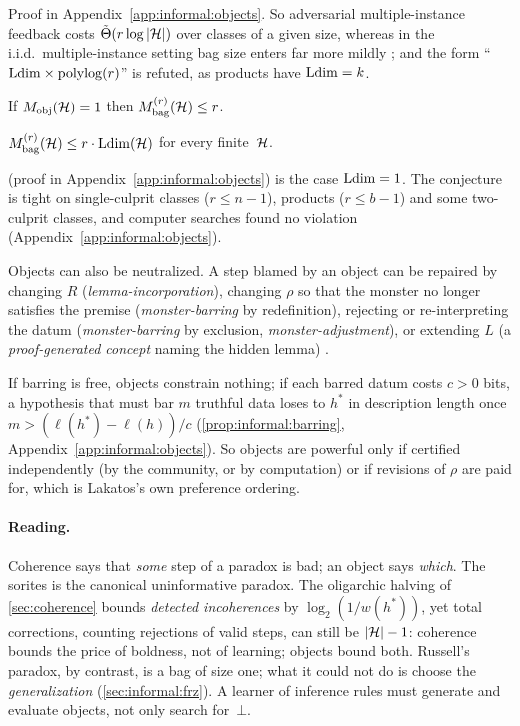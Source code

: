 Proof in Appendix~\ref{app:informal:objects}. So adversarial multiple-instance feedback costs $\tilde\Theta(r\log|\mathcal{H}|)$ over classes of a given size, whereas in the i.i.d.\ multiple-instance setting \citep{dietterich1997solving} bag size enters far more mildly \citep{sabato2012multi}; and the form ``$\mathrm{Ldim}\times\mathrm{polylog}(r)$'' is refuted, as products have $\mathrm{Ldim}=k$.

\begin{proposition}[Bag price when $\Mobj=1$]\label{prop:informal:ldim1}
If $M_{\mathrm{obj}}(\mathcal{H})=1$ then $M^{(r)}_{\mathrm{bag}}(\mathcal{H})\le r$.
\end{proposition}

\begin{conjecture}\label{conj:informal:bagprice}
$M^{(r)}_{\mathrm{bag}}(\mathcal{H})\le r\cdot\mathrm{Ldim}(\mathcal{H})$ for every finite~$\mathcal{H}$.
\end{conjecture}

 (proof in Appendix~\ref{app:informal:objects}) is the case $\mathrm{Ldim}=1$. The conjecture is tight on single-culprit classes ($r\le n-1$), products ($r\le b-1$) and some two-culprit classes, and computer searches found no violation (Appendix~\ref{app:informal:objects}).

Objects can also be neutralized. A step blamed by an object can be repaired by changing $R$ (\emph{lemma-incorporation}), changing $\rho$ so that the monster no longer satisfies the premise (\emph{monster-barring} by redefinition), rejecting or re-interpreting the datum (\emph{monster-barring} by exclusion, \emph{monster-adjustment}), or extending $L$ (a \emph{proof-generated concept} naming the hidden lemma) \citep{lakatos1976proofs}.

If barring is free, objects constrain nothing; if each barred datum costs $c>0$ bits, a hypothesis that must bar $m$ truthful data loses to $h^*$ in description length once $m>(\ell(h^*)-\ell(h))/c$ (\cref{prop:informal:barring}, Appendix~\ref{app:informal:objects}). So objects are powerful only if certified independently (by the community, or by computation) or if revisions of $\rho$ are paid for, which is Lakatos's own preference ordering.

\paragraph{Reading.}
Coherence says that \emph{some} step of a paradox is bad; an object says \emph{which}. The sorites is the canonical uninformative paradox. The oligarchic halving of \cref{sec:coherence} bounds \emph{detected incoherences} by $\log_2(1/w(h^*))$, yet total corrections, counting rejections of valid steps, can still be $|\mathcal{H}|-1$: coherence bounds the price of boldness, not of learning; objects bound both. Russell's paradox, by contrast, is a bag of size one; what it could not do is choose the \emph{generalization} (\cref{sec:informal:frz}). A learner of inference rules must generate and evaluate objects, not only search for~$\bot$.

